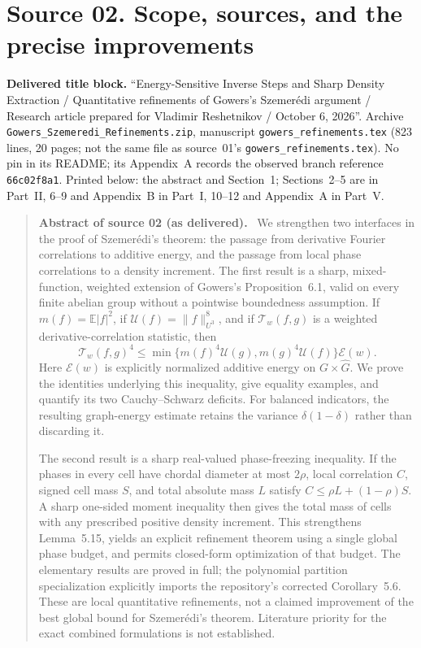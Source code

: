 \documentclass[11pt,letterpaper]{article}
\numberwithin{equation}{section}
\theoremstyle{definition}
\theoremstyle{remark}
\newcommand{\E}{\mathbb E}
\newcommand{\1}{\mathbf 1}
\newcommand{\U}{\mathcal U}
\newcommand{\calE}{\mathcal E}
\newcommand{\calT}{\mathcal T}
\newcommand{\file}[1]{\nolinkurl{#1}}
\newcommand{\srcnote}[2]{\par\noindent{\small\textit{Source #1, delivered #2.}}\par}
\newenvironment{partabstract}[1]{\begin{quote}\small\noindent\textbf{Abstract of source #1 (as delivered).}\ }{\end{quote}}
\newcommand{\partsource}[1]{\par\noindent\begin{minipage}{\textwidth}\small #1\end{minipage}\par\medskip}
\begin{document}
\section[{Source 02: Scope, sources, and the precise improvements}]{Source 02. Scope, sources, and the precise improvements}\label{gsr:fm:02:sec:d1}
\srcnote{02}{Section 1}
\partsource{\textbf{Delivered title block.} ``Energy-Sensitive Inverse Steps and Sharp Density Extraction / Quantitative refinements of Gowers's Szemer\'edi argument / Research article prepared for Vladimir Reshetnikov / October 6, 2026''. Archive \file{Gowers\_Szemeredi\_Refinements.zip}, manuscript \file{gowers\_refinements.tex} (823 lines, 20 pages; not the same file as source~01's \file{gowers\_refinements.tex}). No pin in its README; its Appendix~A records the observed branch reference \texttt{66c02f8a1}. Printed below: the abstract and Section~1; Sections~2--5 are in Part~II, 6--9 and Appendix~B in Part~I, 10--12 and Appendix~A in Part~V.}
\begin{partabstract}{02}
We strengthen two interfaces in the proof of Szemer\'edi's theorem: the passage from derivative Fourier correlations to additive energy, and the passage from local phase correlations to a density increment. The first result is a sharp, mixed-function, weighted extension of Gowers's Proposition~6.1, valid on every finite abelian group without a pointwise boundedness assumption. If $m(f)=\E|f|^2$, if $\U(f)=\|f\|_{U^3}^8$, and if $\calT_w(f,g)$ is a weighted derivative-correlation statistic, then
\[
 \calT_w(f,g)^4\leq
 \min\{m(f)^4\U(g),m(g)^4\U(f)\}\calE(w).
\]
Here $\calE(w)$ is explicitly normalized additive energy on $G\times\widehat G$. We prove the identities underlying this inequality, give equality examples, and quantify its two Cauchy--Schwarz deficits. For balanced indicators, the resulting graph-energy estimate retains the variance $\delta(1-\delta)$ rather than discarding it.

The second result is a sharp real-valued phase-freezing inequality. If the phases in every cell have chordal diameter at most $2\rho$, local correlation $C$, signed cell mass $S$, and total absolute mass $L$ satisfy $C\leq\rho L+(1-\rho)S$. A sharp one-sided moment inequality then gives the total mass of cells with any prescribed positive density increment. This strengthens Lemma~5.15, yields an explicit refinement theorem using a single global phase budget, and permits closed-form optimization of that budget. The elementary results are proved in full; the polynomial partition specialization explicitly imports the repository's corrected Corollary~5.6. These are local quantitative refinements, not a claimed improvement of the best global bound for Szemer\'edi's theorem. Literature priority for the exact combined formulations is not established.
\end{partabstract}
\end{document}
